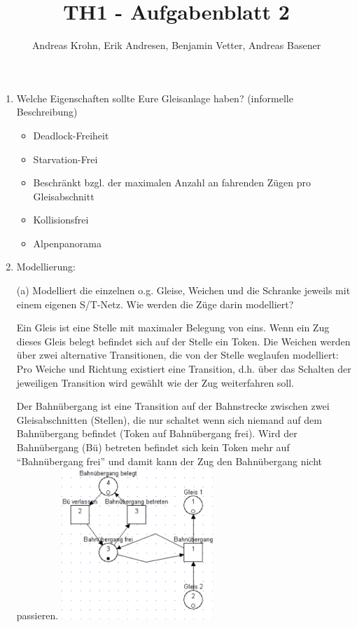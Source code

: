 \documentclass{scrreprt}
\title{TH1 - Aufgabenblatt 2}
\author{Andreas Krohn, Erik Andresen, Benjamin Vetter, Andreas Basener}
\begin{document}
\maketitle

\begin{enumerate}

\item Welche Eigenschaften sollte Eure Gleisanlage haben? (informelle Beschreibung)

\begin{itemize}
  \item Deadlock-Freiheit
  \item Starvation-Frei
  \item Beschränkt bzgl. der maximalen Anzahl an fahrenden Zügen pro Gleisabschnitt
  \item Kollisionsfrei
  \item Alpenpanorama
\end{itemize}

\newpage

\item Modellierung:

(a) Modelliert die einzelnen o.g. Gleise, Weichen und die Schranke jeweils mit
    einem eigenen S/T-Netz. Wie werden die Züge darin modelliert?


Ein Gleis ist eine Stelle mit maximaler Belegung von eins. Wenn ein Zug dieses Gleis belegt befindet sich auf der Stelle ein Token.
Die Weichen werden über zwei alternative Transitionen, die von der Stelle weglaufen modelliert: Pro Weiche und Richtung existiert eine Transition, d.h. über das Schalten der
jeweiligen Transition wird gewählt wie der Zug weiterfahren soll.

Der Bahnübergang ist eine Transition auf der Bahnstrecke zwischen zwei Gleisabschnitten (Stellen), die nur schaltet wenn sich niemand auf dem Bahnübergang befindet (Token auf Bahnübergang frei). Wird der Bahnübergang (Bü) betreten befindet sich kein Token mehr auf "`Bahnübergang frei"' und damit kann der Zug den Bahnübergang nicht passieren.
\includegraphics[width=0.45\textwidth]{bahnuebergang.pdf}


\end{enumerate}
\end{document}
